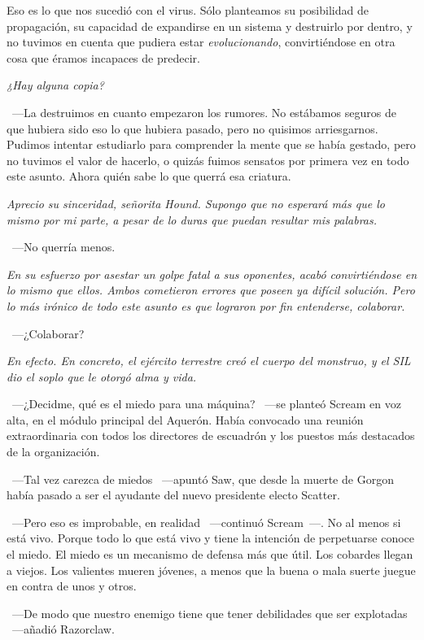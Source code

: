 \rquoti Eso es lo que nos sucedió con el virus. Sólo planteamos su posibilidad de propagación, su capacidad de expandirse en un sistema y destruirlo por dentro, y no tuvimos en cuenta que pudiera estar \emph{evolucionando}, convirtiéndose en otra cosa que éramos incapaces de predecir.

\emph{¿Hay alguna copia?}

~---La destruimos en cuanto empezaron los rumores. No estábamos seguros de que hubiera sido eso lo que hubiera pasado, pero no quisimos arriesgarnos. Pudimos intentar estudiarlo para comprender la mente que se había gestado, pero no tuvimos el valor de hacerlo, o quizás fuimos sensatos por primera vez en todo este asunto. Ahora quién sabe lo que querrá esa criatura.

\emph{Aprecio su sinceridad, señorita Hound. Supongo que no esperará más que lo mismo por mi parte, a pesar de lo duras que puedan resultar mis palabras.}

~---No querría menos.

\emph{En su esfuerzo por asestar un golpe fatal a sus oponentes, acabó convirtiéndose en lo mismo que ellos. Ambos cometieron errores que poseen ya difícil solución. Pero lo más irónico de todo este asunto es que lograron por fin entenderse, colaborar.}

~---¿Colaborar?

\emph{En efecto. En concreto, el ejército terrestre creó el cuerpo del monstruo, y el SIL dio el soplo que le otorgó alma y vida.}

\bigskip\noindent
~---¿Decidme, qué es el miedo para una máquina? ~---se planteó Scream en voz alta, en el módulo principal del Aquerón. Había convocado una reunión extraordinaria con todos los directores de escuadrón y los puestos más destacados de la organización.

~---Tal vez carezca de miedos ~---apuntó Saw, que desde la muerte de Gorgon había pasado a ser el ayudante del nuevo presidente electo Scatter.

~---Pero eso es improbable, en realidad ~---continuó Scream~---. No al menos si está vivo. Porque todo lo que está vivo y tiene la intención de perpetuarse conoce el miedo. El miedo es un mecanismo de defensa más que útil. Los cobardes llegan a viejos. Los valientes mueren jóvenes, a menos que la buena o mala suerte juegue en contra de unos y otros.

~---De modo que nuestro enemigo tiene que tener debilidades que ser explotadas ~---añadió Razorclaw.

